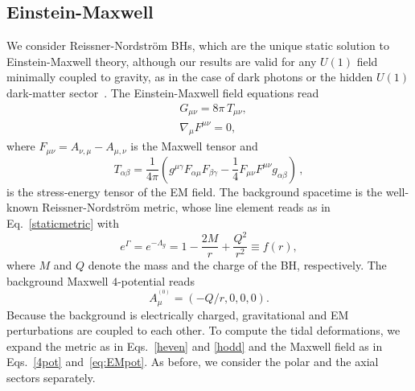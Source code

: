 \documentclass[aps,twocolumn,showpacs,preprintnumbers,nofootinbib,prd,superscriptaddress,groupedaddress,10pt]{revtex4-1}
\begin{document}
\subsection{Einstein-Maxwell} \label{sec:RNBH}
We consider Reissner-Nordstr\"om BHs, which are the unique static solution to Einstein-Maxwell theory, although our results are valid for any $U{(1)}$ field minimally coupled to gravity, as in the case of dark photons or the hidden $U{(1)}$ dark-matter sector~\cite{Cardoso:2016olt}. 
The Einstein-Maxwell field equations read
%
\begin{align}
\label{einstein}
&G_{\mu\nu}=8\pi \,T_{\mu\nu},\\
\label{maxwell}
&\nabla_\mu F^{\mu\nu}=0,
\end{align} 
%
where $F_{\mu\nu}=A_{\nu,\mu}-A_{\mu,\nu}$ is the Maxwell tensor and 
\begin{equation}
T_{\alpha\beta}=\frac{1}{4\pi}\left(g^{\mu\gamma}F_{\alpha\mu}F_{\beta\gamma}-\frac14 F_{\mu\nu}F^{\mu\nu}g_{\alpha\beta}\right)\,,
\end{equation}
%
is the stress-energy tensor of the EM field.
%
The background spacetime is the well-known Reissner-Nordstr\"om metric, whose line element reads as in Eq.~\eqref{staticmetric} with
%
\begin{equation}
\label{metricRN}
e^{\Gamma}=e^{-\Lambda_g}=1-\frac{2M}{r}+\frac{Q^2}{r^2}\equiv f(r),
\end{equation}
%
where $M$ and $Q$ denote the mass and the charge of the BH, respectively. The background Maxwell \mbox{$4$-potential} reads
%
\begin{equation}
A^{^{(0)}}_{\mu}=\left(-Q/r,0,0,0\right).
\end{equation}
%
Because the background is electrically charged, gravitational and EM perturbations are coupled to each other. To compute the tidal deformations, we expand the metric as in Eqs.~\eqref{heven} and \eqref{hodd} and the Maxwell field as in Eqs.~\eqref{4pot} and~\eqref{eq:EMpot}. As before, we consider the polar and the axial sectors separately.
\end{document}
